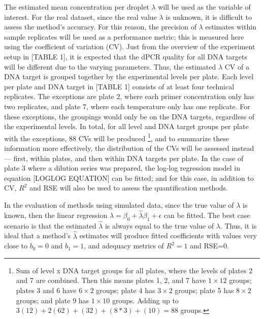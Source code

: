 The estimated mean concentration per droplet \(\lambda\) will be used as the variable of interest. For the real dataset, since the real value \(\lambda\) is unknown, it is difficult to assess the method's accuracy. For this reason, the precision of \(\lambda\) estimates within sample replicates will be used as a performance metric; this is measured here using the coefficient of variation (CV). Just from the overview of the experiment setup in [TABLE 1], it is expected that the dPCR quality for all DNA targets will be different due to the varying parameters. Thus, the estimated \(\lambda\) CV of a DNA target is grouped together by the experimental levels per plate. Each level per plate and DNA target in [TABLE 1] consists of at least four technical replicates. The exceptions are plate 2, where each primer concentration only has two replicates, and plate 7, where each temperature only has one replicate. For these exceptions, the groupings would only be on the DNA targets, regardless of the experimental levels. In total, for all level and DNA target groups per plate with the exceptions, 88 CVs will be produced \footnote{Sum of level x DNA target groups for all plates, where the levels of plates 2 and 7 are combined. Then this means plates 1, 2, and 7 have \(1 \times 12\) groups; plates 3 and 6 have \(6 \times 2\) groups; plate 4 has \(3 \times 2\) groups; plate 5 has \(8 \times 2\) groups; and plate 9 has \(1 \times 10\) groups. Adding up to \(3(12) + 2(62) + (32) + (8*3) + (10) = 88\) groups.}, and to summarize these information more effectively, the distribution of the CVs will be assessed instead — first, within plates, and then within DNA targets per plate. In the case of plate 3 where a dilution series was prepared, the log-log regression model in equation [LOGLOG EQUATION] can be fitted; and for this case, in addition to CV, \(R^2\) and RSE will also be used to assess the quantification methods.

In the evaluation of methods using simulated data, since the true value of \(\lambda\) is known, then the linear regression \(\lambda = \beta_0 + \hat{\lambda}\beta_1 + \epsilon\) can be fitted. The best case scenario is that the estimated \(\hat{\lambda}\) is always equal to the true value of \(\lambda\). Thus, it is ideal that a method's \(\hat{\lambda}\) estimates will produce fitted coefficients with values very close to \(b_0=0\) and \(b_1=1\), and adequacy metrics of \(R^2=1\) and RSE=0.